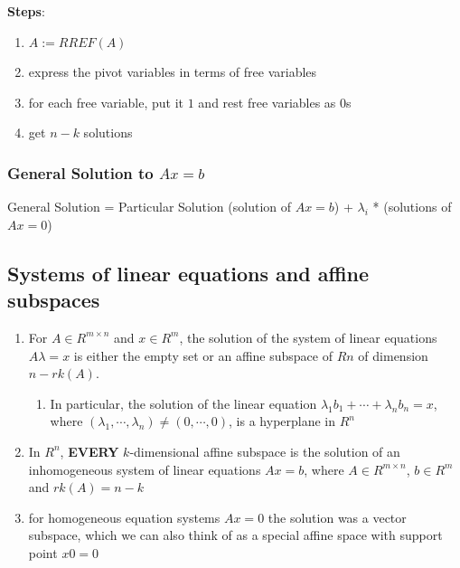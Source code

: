 \textbf{Steps}:
\begin{enumerate}
    \item $A := RREF(A)$

    \item express the pivot variables in terms of free variables

    \item for each free variable, put it $1$ and rest free variables as $0$s

    \item get $n-k$ solutions

\end{enumerate}


\subsubsection{General Solution to $Ax=b$ \cite{mfml-1}}\label{General Solution to Ax=b}

General Solution = Particular Solution (solution of $Ax=b$) + $\lambda_i$ * (solutions of $Ax = 0$)


\subsection{Systems of linear equations and affine subspaces \cite{mfml-1}}\label{Systems of linear equations and affine subspaces}
\begin{enumerate}
    \item For $A \in  R^{m\times n}$ and $x \in  R^m$, the solution of the system of linear equations $A\lambda  = x$ is either the empty set or an affine subspace of $Rn$ of dimension $n - rk(A)$. 

    \begin{enumerate}
        \item In particular, the solution of the linear equation $\lambda _1b_1 + \cdots  + \lambda _nb_n = x$, where $(\lambda _1, \cdots  , \lambda _n) \neq (0, \cdots  , 0)$, is a hyperplane in $R^n$
    \end{enumerate}

    \item In $R^n$, \textbf{EVERY} $k$-dimensional affine subspace is the solution of an inhomogeneous system of linear equations $Ax = b$, where $A \in  R^{m\times n}$, $b \in  R^m$ and $rk(A) = n - k$

    \item for homogeneous equation systems $Ax = 0$ the solution was a vector subspace, which we can also think of as a special affine space with support point $x0 = 0$
\end{enumerate}




